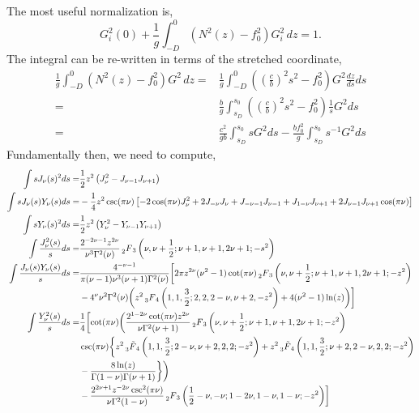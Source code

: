 \documentclass[11pt]{article}
\begin{document}
The most useful normalization is,
\begin{equation}
\label{k_const_norm}
G_i^2(0)+\frac{1}{g} \int_{-D}^{0} (N^2(z)-f_0^2) G_i^2 \, dz = 1 \tag{$K$-constant norm}.
\end{equation}
The integral can be re-written in terms of the stretched coordinate,
\begin{align}
\frac{1}{g} \int_{-D}^{0} (N^2(z)-f_0^2) G^2 \, dz =& \frac{1}{g} \int_{-D}^{0} \left(\left(\frac{c}{b}\right)^2 s^2 -f_0^2\right) G^2 \frac{dz}{ds}ds \\
=& \frac{b}{g} \int_{s_D}^{s_0}  \left(\left(\frac{c}{b}\right)^2 s^2 -f_0^2\right) \frac{1}{s} G^2 ds \\
=& \frac{c^2}{g b} \int_{s_D}^{s_0}  s G^2 ds - \frac{b f_0^2}{g} \int_{s_D}^{s_0}  s^{-1} G^2 ds
\end{align}
Fundamentally then, we need to compute,
\begin{align}
\int s J_\nu(s)^2 ds =& \frac{1}{2} z^2 \left( J_\nu^2 - J_{\nu-1} J_{\nu+1} \right) \\
\int s J_\nu(s) Y_\nu(s) ds =& - \frac{1}{4} z^2 \csc(\pi \nu) \left[ -2 \cos(\pi \nu) J_\nu^2 + 2 J_{-\nu} J_{\nu} + J_{-\nu-1}J_{\nu-1}+J_{1-\nu}J_{\nu+1}+2J_{\nu-1}J_{\nu+1}\cos(\pi\nu) \right]\\
\int s Y_\nu(s)^2 ds =&  \frac{1}{2} z^2 \left( Y_\nu^2 - Y_{\nu-1} Y_{\nu+1} \right) \\
\int  \frac{J_\nu^2(s)}{s} ds =& \frac{2^{-2\nu-1} z^{2\nu}}{\nu^3 \Gamma^2(\nu)} \prescript{}{2}{F}_3 \left(\nu,\nu+\frac{1}{2}; \nu+1,\nu+1,2\nu+1; -s^2 \right)  \\ \nonumber
\int  \frac{J_\nu(s) Y_\nu(s)}{s} ds =& \frac{4^{-\nu-1}}{\pi(\nu-1)\nu^3(\nu+1)\Gamma^2(\nu)} \biggl[   2\pi z^{2\nu} (\nu^2-1) \cot(\pi \nu) \prescript{}{2}{F}_3 \left(\nu,\nu+\frac{1}{2};\nu+1,\nu+1,2\nu+1;-z^2 \right) \\ \nonumber
& -4^\nu \nu^2 \Gamma^2(\nu) \biggl( z^2 \prescript{}{3}{F}_4 \left(1,1,\frac{3}{2};2,2,2-\nu,\nu+2,-z^2 \right) + 4(\nu^2-1)\ln(z) \biggr) \biggr] \\ \nonumber
\int  \frac{Y_\nu^2(s)}{s} ds =& \frac{1}{4} \biggl[ \cot(\pi \nu) \biggl( \frac{2^{1-2\nu} \cot(\pi \nu) z^{2\nu}}{\nu \Gamma^2(\nu+1)}  \prescript{}{2}{F}_3 \left(\nu,\nu+\frac{1}{2};\nu+1,\nu+1,2\nu+1;-z^2 \right) \\ \nonumber
&\csc(\pi \nu) \biggl\{ z^2 \prescript{}{3}{\tilde{F}}_4 \left(1,1,\frac{3}{2};2-\nu,\nu+2,2,2;-z^2 \right)  + z^2 \prescript{}{3}{\tilde{F}}_4 \left(1,1,\frac{3}{2};\nu+2,2-\nu,2,2;-z^2 \right)  \\ \nonumber
& - \frac{8 \ln(z)}{\Gamma(1-\nu) \Gamma(\nu+1)}  \biggr\} \biggr) \\ \nonumber
& - \frac{2^{2\nu+1} z^{-2\nu} \csc^2 (\pi \nu) }{\nu \Gamma^2(1-\nu)} \prescript{}{2}{F}_3 \left(\frac{1}{2}-\nu,-\nu;1-2\nu,1-\nu,1-\nu;-z^2 \right) \biggr]
\end{align}
\end{document}
